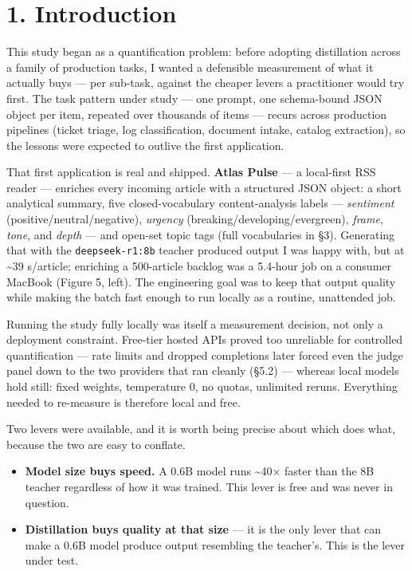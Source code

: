 \documentclass[11pt]{article}
\providecommand{\tightlist}{\setlength{\itemsep}{0pt}\setlength{\parskip}{0pt}}
\providecommand{\tightlist}{%
  \setlength{\itemsep}{0pt}\setlength{\parskip}{0pt}}
\begin{document}
\section{1. Introduction}\label{introduction}

This study began as a quantification problem: before adopting
distillation across a family of production tasks, I wanted a defensible
measurement of what it actually buys --- per sub-task, against the
cheaper levers a practitioner would try first. The task pattern under
study --- one prompt, one schema-bound JSON object per item, repeated
over thousands of items --- recurs across production pipelines (ticket
triage, log classification, document intake, catalog extraction), so the
lessons were expected to outlive the first application.

That first application is real and shipped. \textbf{Atlas Pulse} --- a
local-first RSS reader --- enriches every incoming article with a
structured JSON object: a short analytical summary, five
closed-vocabulary content-analysis labels --- \emph{sentiment}
(positive/neutral/negative), \emph{urgency}
(breaking/developing/evergreen), \emph{frame}, \emph{tone}, and
\emph{depth} --- and open-set topic tags (full vocabularies in §3).
Generating that with the \texttt{deepseek-r1:8b} teacher produced output
I was happy with, but at \textasciitilde39 s/article; enriching a
500-article backlog was a 5.4-hour job on a consumer MacBook (Figure 5,
left). The engineering goal was to keep that output quality while making
the batch fast enough to run locally as a routine, unattended job.

Running the study fully locally was itself a measurement decision, not
only a deployment constraint. Free-tier hosted APIs proved too
unreliable for controlled quantification --- rate limits and dropped
completions later forced even the judge panel down to the two providers
that ran cleanly (§5.2) --- whereas local models hold still: fixed
weights, temperature 0, no quotas, unlimited reruns. Everything needed
to re-measure is therefore local and free.

Two levers were available, and it is worth being precise about which
does what, because the two are easy to conflate.

\begin{itemize}
\tightlist
\item
  \textbf{Model size buys speed.} A 0.6B model runs \textasciitilde40×
  faster than the 8B teacher regardless of how it was trained. This
  lever is free and was never in question.
\item
  \textbf{Distillation buys quality at that size} --- it is the only
  lever that can make a 0.6B model produce output resembling the
  teacher's. This is the lever under test.
\end{itemize}
\end{document}
